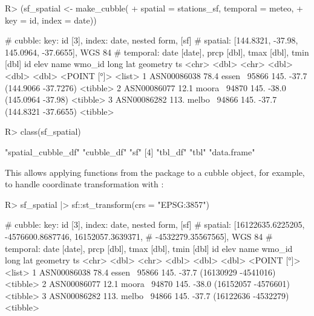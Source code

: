 \documentclass[
  shortnames]{jss}
\begin{document}
\begin{CodeChunk}
\begin{CodeInput}
R> (sf_spatial <- make_cubble(
+   spatial = stations_sf, temporal = meteo, 
+   key = id, index = date))
\end{CodeInput}
\begin{CodeOutput}
# cubble:   key: id [3], index: date, nested form, [sf]
# spatial:  [144.8321, -37.98, 145.0964, -37.6655], WGS 84
# temporal: date [date], prcp [dbl], tmax [dbl], tmin [dbl]
  id           elev name   wmo_id  long   lat            geometry ts      
  <chr>       <dbl> <chr>   <dbl> <dbl> <dbl>         <POINT [°]> <list>  
1 ASN00086038  78.4 essen~  95866  145. -37.7 (144.9066 -37.7276) <tibble>
2 ASN00086077  12.1 moora~  94870  145. -38.0   (145.0964 -37.98) <tibble>
3 ASN00086282 113.  melbo~  94866  145. -37.7 (144.8321 -37.6655) <tibble>
\end{CodeOutput}
\begin{CodeInput}
R> class(sf_spatial)
\end{CodeInput}
\begin{CodeOutput}
[1] "spatial_cubble_df" "cubble_df"         "sf"               
[4] "tbl_df"            "tbl"               "data.frame"       
\end{CodeOutput}
\end{CodeChunk}

This allows applying functions from the  package to a cubble object, for example, to handle coordinate transformation with :

\begin{CodeChunk}
\begin{CodeInput}
R> sf_spatial |> sf::st_transform(crs = "EPSG:3857")
\end{CodeInput}
\begin{CodeOutput}
# cubble:   key: id [3], index: date, nested form, [sf]
# spatial:  [16122635.6225205, -4576600.8687746, 16152057.3639371,
#   -4532279.35567565], WGS 84
# temporal: date [date], prcp [dbl], tmax [dbl], tmin [dbl]
  id           elev name   wmo_id  long   lat            geometry ts      
  <chr>       <dbl> <chr>   <dbl> <dbl> <dbl>         <POINT [°]> <list>  
1 ASN00086038  78.4 essen~  95866  145. -37.7 (16130929 -4541016) <tibble>
2 ASN00086077  12.1 moora~  94870  145. -38.0 (16152057 -4576601) <tibble>
3 ASN00086282 113.  melbo~  94866  145. -37.7 (16122636 -4532279) <tibble>
\end{CodeOutput}
\end{CodeChunk}
\end{document}
